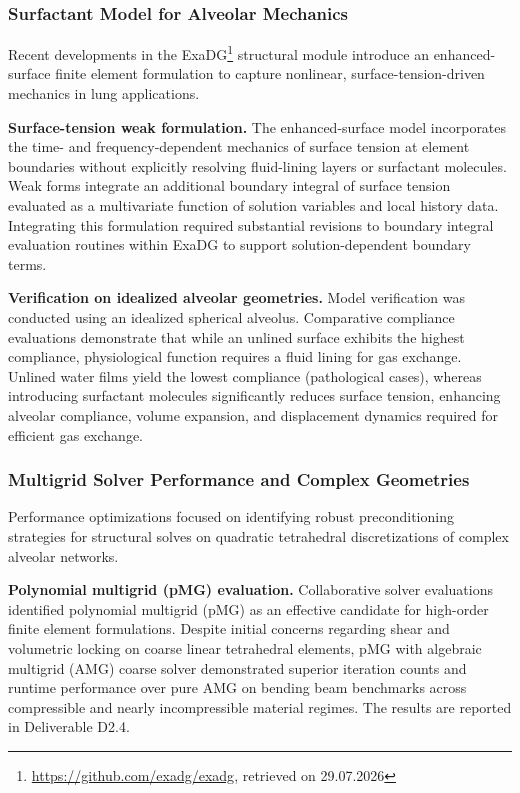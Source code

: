 \documentclass[a4paper,12pt, numbers]{article}
\begin{document}
\subsubsection*{Surfactant Model for Alveolar Mechanics}

\noindent Recent developments in the ExaDG\footnote{\url{https://github.com/exadg/exadg}, retrieved on 29.07.2026} structural module introduce an enhanced-surface finite element formulation to capture nonlinear, surface-tension-driven mechanics in lung applications.

\noindent\textbf{Surface-tension weak formulation.}
The enhanced-surface model incorporates the time- and frequency-dependent mechanics of surface tension at element boundaries without explicitly resolving fluid-lining layers or surfactant molecules. Weak forms integrate an additional boundary integral of surface tension evaluated as a multivariate function of solution variables and local history data. Integrating this formulation required substantial revisions to boundary integral evaluation routines within ExaDG to support solution-dependent boundary terms.

\noindent\textbf{Verification on idealized alveolar geometries.}
Model verification was conducted using an idealized spherical alveolus. Comparative compliance evaluations demonstrate that while an unlined surface exhibits the highest compliance, physiological function requires a fluid lining for gas exchange. Unlined water films yield the lowest compliance (pathological cases), whereas introducing surfactant molecules significantly reduces surface tension, enhancing alveolar compliance, volume expansion, and displacement dynamics required for efficient gas exchange.

\subsubsection*{Multigrid Solver Performance and Complex Geometries}

\noindent Performance optimizations focused on identifying robust preconditioning strategies for structural solves on quadratic tetrahedral discretizations of complex alveolar networks.

\noindent\textbf{Polynomial multigrid (pMG) evaluation.}
Collaborative solver evaluations identified polynomial multigrid (pMG) as an effective candidate for high-order finite element formulations. Despite initial concerns regarding shear and volumetric locking on coarse linear tetrahedral elements, pMG with algebraic multigrid (AMG) coarse solver demonstrated superior iteration counts and runtime performance over pure AMG on bending beam benchmarks across compressible and nearly incompressible material regimes. The results are reported in Deliverable D2.4.
\end{document}
